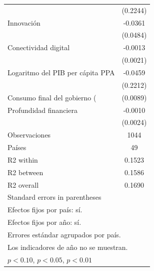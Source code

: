 \begin{table}[htbp]
\begin{tabular}{l*{1}{c}}
                    &    (0.2244)         \\
\addlinespace
Innovación          &     -0.0361         \\
                    &    (0.0484)         \\
\addlinespace
Conectividad digital&     -0.0013         \\
                    &    (0.0021)         \\
\addlinespace
Logaritmo del PIB per cápita PPA&     -0.0459         \\
                    &    (0.2212)         \\
\addlinespace
Consumo final del gobierno (%
                    &    (0.0089)         \\
\addlinespace
Profundidad financiera&     -0.0010         \\
                    &    (0.0024)         \\
\midrule
Observaciones       &        1044         \\
Países              &          49         \\
R2 within           &      0.1523         \\
R2 between          &      0.1586         \\
R2 overall          &      0.1690         \\
\bottomrule
\multicolumn{2}{l}{\footnotesize Standard errors in parentheses}\\
\multicolumn{2}{l}{\footnotesize Efectos fijos por país: sí.}\\
\multicolumn{2}{l}{\footnotesize Efectos fijos por año: sí.}\\
\multicolumn{2}{l}{\footnotesize Errores estándar agrupados por país.}\\
\multicolumn{2}{l}{\footnotesize Los indicadores de año no se muestran.}\\
\multicolumn{2}{l}{\footnotesize \sym{*} \(p<0.10\), \sym{**} \(p<0.05\), \sym{***} \(p<0.01\)}\\
\end{tabular}
\end{table}

